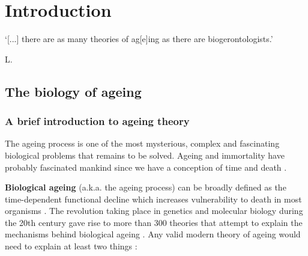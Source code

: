 
\chapter{Introduction}  \label{c:1} %

\ifpdf
    \graphicspath{{Chapter1/Figs/Raster/}{Chapter1/Figs/PDF/}{Chapter1/Figs/}}
\else
    \graphicspath{{Chapter1/Figs/Vector/}{Chapter1/Figs/}}
\fi



\epigraph{`[...] there are as many theories of ag[e]ing as there are biogerontologists.'}{L. \citet{Hayflick2007}}

\section{The biology of ageing} %

\subsection{A brief introduction to ageing theory}

The ageing process is one of the most mysterious, complex and fascinating biological problems that remains to be solved. Ageing and immortality have probably fascinated mankind since we have a conception of time and death \citep{Renfrew2016}. 

\bigskip

\textbf{Biological ageing} (\acrshort{a.k.a.} the ageing process) can be broadly defined as the time-dependent functional decline which increases vulnerability to death in most organisms \citep{Lopez-Otin2013}. The revolution taking place in genetics and molecular biology during the 20th century gave rise to more than 300 theories that attempt to explain the mechanisms behind biological ageing \citep{Medvedev1990}. Any valid modern theory of ageing would need to explain at least two things \citep{Medvedev1990}:

